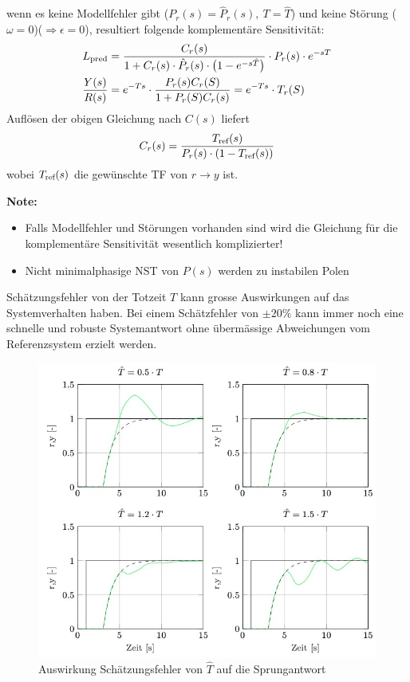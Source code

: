     wenn es keine Modellfehler gibt ($P_r(s) = \hat P_r(s),\ T = \hat T$) und keine Störung ($\omega = 0$)($\Rightarrow \epsilon = 0$), resultiert folgende komplementäre Sensitivität:
    \begin{align*}
        L_{\textnormal{pred}} &= \frac{C_r(s)}{1 + C_r(s)\cdot\hat{P}_r(s)\cdot\big(1 - e^{-s\hat{T}}\big)}\cdot P_r(s)\cdot e^{-sT}\\
        \frac{Y(s)}{R(s)} &= e^{-Ts}\cdot\frac{P_r(s)C_r(S)}{1+P_r(S)C_r(s)} = e^{-Ts}\cdot T_r(S)
    \end{align*}
    Auflösen der obigen Gleichung nach $C(s)$ liefert
    \begin{equation*}
        C_r(s) = \frac{T_{\textnormal{ref}}(s)}{P_r(s)\cdot(1-T_{\textnormal{ref}}(s))}
    \end{equation*}
    wobei $T_\textnormal{ref}(s)$ die gewünschte TF von $r\rightarrow y$ ist.
    
    \textbf{Note:} 
    \begin{itemize}
        \item Falls Modellfehler und Störungen vorhanden sind wird die Gleichung für die komplementäre Sensitivität wesentlich komplizierter!
        
        \item Nicht minimalphasige NST von $P(s)$ werden zu instabilen Polen 
    \end{itemize}
    
    Schätzungsfehler von der Totzeit $T$ kann grosse Auswirkungen auf das Systemverhalten haben. Bei einem Schätzfehler von $\pm 20\%$ kann immer noch eine schnelle und robuste Systemantwort ohne übermässige Abweichungen vom Referenzsystem erzielt werden.
    \begin{figure}[H]
        \centering
        \includegraphics[width = 0.8\linewidth]{images/02/est_error_hat_T.jpg}
        \caption{Auswirkung Schätzungsfehler von $\hat{T}$ auf die Sprungantwort}
    \end{figure}
    
